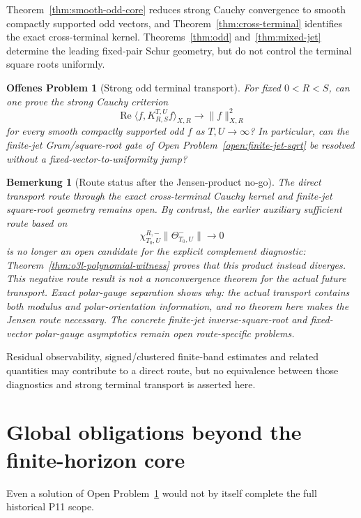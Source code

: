 \documentclass[11pt,a4paper]{amsart}
\newtheorem{remark}[theorem]{Bemerkung}
\newtheorem{openproblem}[theorem]{Offenes Problem}
\begin{document}
Theorem~\ref{thm:smooth-odd-core} reduces strong Cauchy convergence to smooth compactly
supported odd vectors, and Theorem~\ref{thm:cross-terminal} identifies the exact
cross-terminal kernel.  Theorems~\ref{thm:odd} and~\ref{thm:mixed-jet} determine the
leading fixed-pair Schur geometry, but do not control the terminal square roots uniformly.

\begin{openproblem}[Strong odd terminal transport]\label{open:transport}
For fixed $0<R<S$, can one prove the strong Cauchy criterion
\[
 \operatorname{Re}\langle f,K_{R,S}^{T,U}f\rangle_{X,R}
 \longrightarrow\|f\|_{X,R}^2
\]
for every smooth compactly supported odd $f$ as $T,U\to\infty$?  In particular, can the
finite-jet Gram/square-root gate of Open Problem~\ref{open:finite-jet-sqrt} be resolved
without a fixed-vector-to-uniformity jump?
\end{openproblem}

\begin{remark}[Route status after the Jensen-product no-go]\label{rem:routes}
The direct transport route through the exact cross-terminal Cauchy kernel and finite-jet
square-root geometry remains open.  By contrast, the earlier auxiliary sufficient route
based on
\[
 \chi_{T_0,U}^{R,-}\|\Theta_{T_0,U}^-\|\to0
\]
is no longer an open candidate for the explicit complement diagnostic:
Theorem~\ref{thm:o3l-polynomial-witness} proves that this product instead diverges.
This negative route result is not a nonconvergence theorem for the actual future
transport.  Exact polar-gauge separation shows why: the actual transport contains both
modulus and polar-orientation information, and no theorem here makes the Jensen route
necessary.  The concrete finite-jet inverse-square-root and fixed-vector polar-gauge
asymptotics remain open route-specific problems.
\end{remark}

Residual observability, signed/clustered finite-band estimates and related quantities may
contribute to a direct route, but no equivalence between those diagnostics and strong
terminal transport is asserted here.

\section{Global obligations beyond the finite-horizon core}\label{sec:global}

Even a solution of Open Problem~\ref{open:transport} would not by itself complete the
full historical P11 scope.
\end{document}
